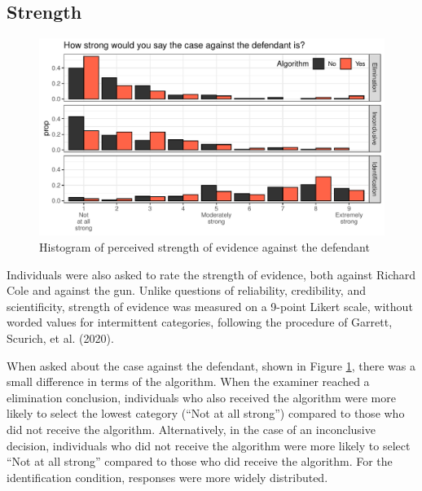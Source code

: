 \documentclass[print]{nuthesis}
\begin{document}
\hypertarget{strength}{%
\subsection{Strength}\label{strength}}

\begin{figure}

{\centering \includegraphics[width=\linewidth]{thesis_files/figure-latex/strength-1} 

}

\caption{Histogram of perceived strength of evidence against the defendant}\label{fig:strength}
\end{figure}

Individuals were also asked to rate the strength of evidence, both against Richard Cole and against the gun.
Unlike questions of reliability, credibility, and scientificity, strength of evidence was measured on a 9-point Likert scale, without worded values for intermittent categories, following the procedure of Garrett, Scurich, et al. (2020).

When asked about the case against the defendant, shown in Figure \ref{fig:strength}, there was a small difference in terms of the algorithm.
When the examiner reached a elimination conclusion, individuals who also received the algorithm were more likely to select the lowest category (``Not at all strong'') compared to those who did not receive the algorithm.
Alternatively, in the case of an inconclusive decision, individuals who did not receive the algorithm were more likely to select ``Not at all strong'' compared to those who did receive the algorithm.
For the identification condition, responses were more widely distributed.
\end{document}
